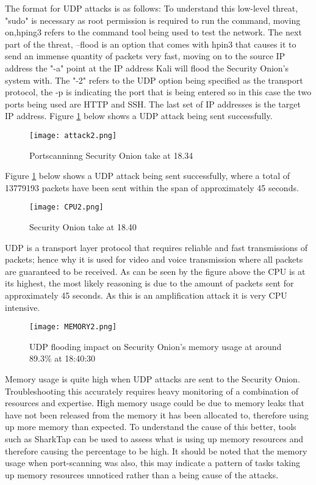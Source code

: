 \documentclass[12pt]{article}
\begin{document}
		The format for UDP attacks is as follows:
		To understand this low-level threat, "sudo" is necessary as root permission is required to run the command, moving on,hping3 refers to the command tool being used to test the network. The next part of the threat, --flood is an option that comes with hpin3 that causes it to send an immense quantity of packets very fast, moving on to the source IP address the "-a" point at the IP address Kali will flood the Security Onion's system with. The "-2" refers to the UDP option being specified as the transport protocol, the -p is indicating the port that is being entered so in this case the two ports being used are HTTP and SSH. The last set of IP addresses is the target IP address.
		Figure \ref{fig:35} below shows a UDP attack being sent successfully.
		\begin{center}
		\begin{figure}[H]
			\centering
			\texttt{[image: attack2.png]}
			\caption{Portscanninng Security Onion take at 18.34 } 
			\label{fig:35}
		\end{figure}
		\end{center}
		Figure \ref{fig:35} below shows a UDP attack being sent successfully, where a total of 13779193 packets have been sent within the span of approximately 45 seconds.
		
		\begin{center}
		\begin{figure}[H]
			\centering
			\texttt{[image: CPU2.png]}
			\caption{ Security Onion take at 18.40 } 
			\label{fig:attack1}
		\end{figure}
		\end{center}
		UDP is a transport layer protocol that requires reliable and fast transmissions of packets; hence why it is used for video and voice transmission where all packets are guaranteed to be received.
		As can be seen by the figure above the CPU is at its highest, the most likely reasoning is due to the amount of packets sent for approximately 45 seconds. As this is an amplification attack it is very CPU intensive.
		
		\begin{center}
		\begin{figure}[H]
			\centering
			\texttt{[image: MEMORY2.png]}
			\caption{UDP flooding impact on Security Onion's memory usage at around 89.3\% at 18:40:30  } 
			\label{fig:memory2}
		\end{figure}
		\end{center}
		Memory usage is quite high when UDP attacks are sent to the Security Onion. Troubleshooting this accurately requires heavy monitoring of a combination of resources and expertise. High memory usage could be due to memory leaks that have not been released from the memory it has been allocated to, therefore using up more memory than expected. 
		To understand the cause of this better, tools such as SharkTap can be used to assess what is using up memory resources and therefore causing the percentage to be high. It should be noted that the memory usage when port-scanning was also, this may indicate a pattern of tasks taking up memory resources unnoticed rather than a being cause of the attacks.
		
\end{document}

